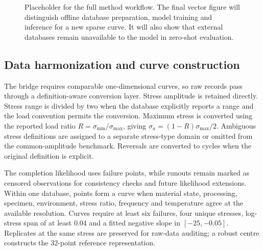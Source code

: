 \documentclass[a4paper,fleqn]{cas-dc}
\begin{document}
\begin{figure}[t]
\centering
{}
\caption{Placeholder for the full method workflow. The final vector figure will distinguish offline database preparation, model training and inference for a new sparse curve. It will also show that external databases remain unavailable to the model in zero-shot evaluation.}
\label{fig:workflow}
\end{figure}

\subsection{Data harmonization and curve construction}

The bridge requires comparable one-dimensional curves, so raw records pass through a definition-aware conversion layer. Stress amplitude is retained directly. Stress range is divided by two when the database explicitly reports a range and the load convention permits the conversion. Maximum stress is converted using the reported load ratio $R=\sigma_{\min}/\sigma_{\max}$, giving $\sigma_a=(1-R)\sigma_{\max}/2$. Ambiguous stress definitions are assigned to a separate stress-type domain or omitted from the common-amplitude benchmark. Reversals are converted to cycles when the original definition is explicit.

The completion likelihood uses failure points, while runouts remain marked as censored observations for consistency checks and future likelihood extensions. Within one database, points form a curve when material state, processing, specimen, environment, stress ratio, frequency and temperature agree at the available resolution. Curves require at least six failures, four unique stresses, log-stress span of at least 0.04 and a fitted negative slope in $[-25,-0.05]$. Replicates at the same stress are preserved for raw-data auditing; a robust centre constructs the 32-point reference representation.
\end{document}
